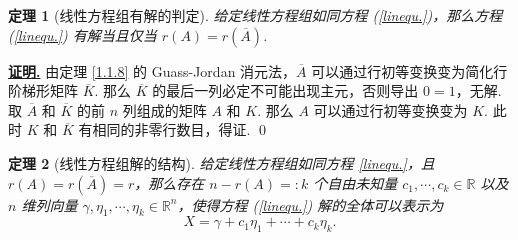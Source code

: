 \documentclass[10pt,openany]{article}
\theoremstyle{thmstyle} %
\newtheorem{theorem}{定理}[subsection]
\theoremstyle{defstyle} %
\theoremstyle{prostyle} %
\theoremstyle{exastyle}
\theoremstyle{remstyle}
\renewenvironment{proof}[1][证明]{\par\underline{\textbf{#1.}} \;\fangsong}{\qed\par}
\begin{document}
\begin{theorem}[线性方程组有解的判定]
	给定线性方程组如同方程 (\ref{linequ.})，那么方程 (\ref{linequ.}) 有解当且仅当 \( r(A)=r(\overline{A}) \).
	\label{1.1.12}
\end{theorem}

\begin{proof}
	由定理 \ref{1.1.8} 的 Guass-Jordan 消元法，\( \overline{A} \) 可以通过行初等变换变为简化行阶梯形矩阵 \( \overline{K} \). 那么 \( \overline{K} \) 的最后一列必定不可能出现主元，否则导出 \( 0=1 \)，无解. 取 \( \overline{A} \) 和 \( \overline{K} \) 的前 \( n \) 列组成的矩阵 \( A \) 和 \( K \). 那么 \( A \) 可以通过行初等变换变为 \( K \). 此时 \( K \) 和 \( \overline{K} \) 有相同的非零行数目，得证.
\end{proof}

\begin{theorem}[线性方程组解的结构]
	给定线性方程组如同方程 \ref{linequ.}，且 \( r(A)=r(\overline{A})=r \)，那么存在 \( n-r(A)=:k \) 个自由未知量 \( c_1,\cdots,c_{k} \in \mathbb{R} \) 以及 \( n \) 维列向量 \( \gamma,\eta_1,\cdots,\eta_k \in \mathbb{R}^n \)，使得方程 (\ref{linequ.}) 解的全体可以表示为
	\[ X=\gamma+c_1\eta_1+\cdots+c_k\eta_k. \] 
	\label{1.1.13}
\end{theorem}
\end{document}
